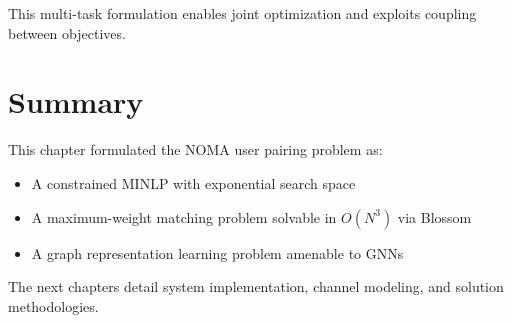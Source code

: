 This multi-task formulation enables joint optimization and exploits coupling between objectives.

\section{Summary}

This chapter formulated the NOMA user pairing problem as:
\begin{itemize}
    \item A constrained MINLP with exponential search space
    \item A maximum-weight matching problem solvable in $O(N^3)$ via Blossom
    \item A graph representation learning problem amenable to GNNs
\end{itemize}

The next chapters detail system implementation, channel modeling, and solution methodologies.
